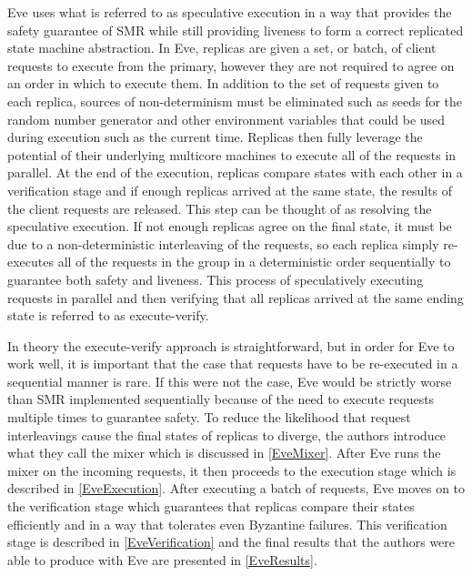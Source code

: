 \documentclass[11pt, oneside]{report}
\begin{document}
Eve uses what is referred to as speculative execution \cite{zyz, eve} in a way that provides the safety guarantee of SMR while still providing liveness to form a correct replicated state machine abstraction. 
In Eve, replicas are given a set, or batch, of client requests to execute from the primary, however they are not required to agree on an order in which to execute them. 
In addition to the set of requests given to each replica, sources of non-determinism must be  eliminated such as seeds for the random number generator and other environment variables that could be used during execution such as the current time.
Replicas then fully leverage the potential of their underlying multicore machines to execute all of the requests in parallel. 
At the end of the execution, replicas compare states with each other in a verification stage and if enough replicas arrived at the same state, the results of the client requests are released. 
This step can be thought of as resolving the speculative execution. 
If not enough replicas agree on the final state, it must be due to a non-deterministic interleaving of the requests, so each replica simply re-executes all of the requests in the group in a deterministic order sequentially to guarantee both safety and liveness. 
This process of speculatively executing requests in parallel and then verifying that all replicas arrived at the same ending state is referred to as execute-verify.

In theory the execute-verify approach is straightforward, but in order for Eve to work well, it is important that the case that requests have to be re-executed in a sequential manner is rare. 
If this were not the case, Eve would be strictly worse than SMR implemented sequentially because of the need to execute requests multiple times to guarantee safety. 
To reduce the likelihood that request interleavings cause the final states of replicas to diverge, the authors introduce what they call the mixer which is discussed in \ref{EveMixer}. 
After Eve runs the mixer on the incoming requests, it then proceeds to the execution stage which is described in \ref{EveExecution}. 
After executing a batch of requests, Eve moves on to the verification stage which guarantees that replicas compare their states efficiently and in a way that tolerates even Byzantine failures. 
This verification stage is described in \ref{EveVerification} and the final results that the authors were able to produce with Eve are presented in \ref{EveResults}.
\end{document}
